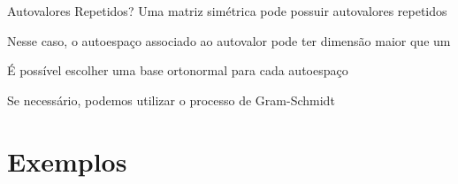 \documentclass[fleqn,aspectratio=169,12pt]{beamer}
\begin{document}
\begin{frame}{Autovalores Repetidos?}
  Uma matriz simétrica pode possuir autovalores repetidos

  \pause
  \bigskip
  Nesse caso, o autoespaço associado ao autovalor pode ter dimensão maior que um

  \pause
  \bigskip
  É possível escolher uma base ortonormal para cada autoespaço

  \pause
  \bigskip
  Se necessário, podemos utilizar o processo de Gram-Schmidt
\end{frame}

\section{Exemplos}







%
%

\end{document}
